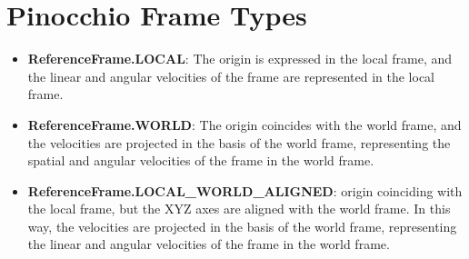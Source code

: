 \documentclass[10pt]{article}
\begin{document}
\section*{Pinocchio Frame Types}

\begin{itemize}
  \item \textbf{ReferenceFrame.LOCAL}: The origin is expressed in the local frame, and the linear and angular velocities of the frame are represented in the local frame.
  \item \textbf{ReferenceFrame.WORLD}: The origin coincides with the world frame, and the velocities are projected in the basis of the world frame, representing the spatial and angular velocities of the frame in the world frame.
  \item \textbf{ReferenceFrame.LOCAL\_WORLD\_ALIGNED}: origin coinciding with the local frame, but the XYZ axes are aligned with the world frame. In this way, the velocities are projected in the basis of the world frame, representing the linear and angular velocities of the frame in the world frame.
\end{itemize}
\end{document}
